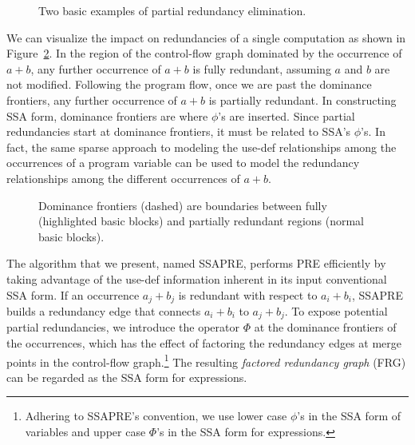 \begin{figure}
\centering
\hfill
{}
\caption{Two basic examples of partial redundancy elimination.}
\label{fig:pre-examples}
\end{figure}

We can visualize the impact on redundancies of a single computation as shown in Figure~\ref{fig:ssapre-motive}. 
In the region of the control-flow graph dominated by the occurrence of $a+b$, any further occurrence of $a+b$ is fully redundant, assuming $a$ and $b$ are not modified. 
Following the program flow, once we are past the dominance frontiers, any further occurrence of $a+b$ is partially redundant. 
In constructing SSA form, dominance frontiers are where $\phi$'s are inserted. 
Since partial redundancies start at dominance frontiers, it must be related to SSA's $\phi$'s. 
In fact, the same sparse approach to modeling the use-def relationships among the occurrences of a program variable can be used to model the redundancy relationships among the different occurrences of $a+b$.

\begin{figure}
\centering
\caption{Dominance frontiers (dashed) are boundaries between fully (highlighted basic blocks) and partially redundant regions (normal basic blocks).}
\label{fig:ssapre-motive}
\end{figure}

The algorithm that we present, named SSAPRE, performs PRE efficiently by taking advantage of the use-def information inherent in its input conventional SSA form. 
If an occurrence $a_j+b_j$ is redundant with respect to $a_i+b_i$, SSAPRE builds a redundancy edge that connects $a_i+b_i$ to $a_j+b_j$. 
To expose potential partial redundancies, we introduce the operator $\Phi$\index{\PHIfun} at the dominance frontiers of the occurrences, which has the effect of factoring the redundancy edges at merge points in the control-flow graph.\footnote{Adhering to SSAPRE's convention, we use lower case $\phi$'s in the SSA form of variables and upper case $\Phi$'s in the SSA form for expressions.} 
The resulting \emph{factored redundancy graph} (FRG) can be regarded as the SSA form for expressions.

